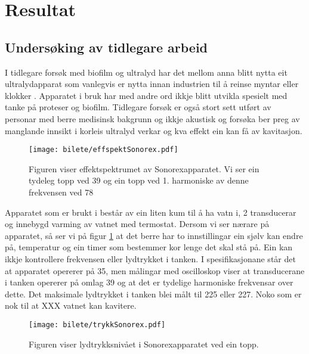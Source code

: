 \section{Resultat}
\subsection{Undersøking av tidlegare arbeid}
I tidlegare forsøk med biofilm og ultralyd har det mellom anna blitt nytta eit ultralydapparat som vanlegvis er nytta innan industrien til å reinse myntar eller klokker \cite{sonorex}. Apparatet i bruk har med andre ord ikkje blitt utvikla spesielt med tanke på proteser og biofilm. Tidlegare forsøk er også stort sett utført av personar med berre medisinsk bakgrunn og ikkje akustisk og forsøka ber preg av manglande innsikt i korleis ultralyd verkar og kva effekt ein kan få av kavitasjon.

\begin{figure}[htbp]
\centering
\texttt{[image: bilete/effspektSonorex.pdf]}
\caption[Effektspektrum av Sonorexapparat]{Figuren viser effektspektrumet av Sonorexapparatet. Vi ser ein tydeleg topp ved \unit{39}{\kilo\hertz} og ein topp ved 1. harmoniske av denne frekvensen ved \unit{78}{\kilo\hertz}}
\label{fig:effektsonorex}
\end{figure}

Apparatet som er brukt i \cite{ultraprotese} består av ein liten kum til å ha vatn i, 2 transducerar og innebygd varming av vatnet med termostat. Dersom vi ser nærare på apparatet, så ser vi på figur \ref{fig:effektsonorex} at det berre har to innstillingar ein sjølv kan endre på, temperatur og ein timer som bestemmer kor lenge det skal stå på. Ein kan ikkje kontrollere frekvensen eller lydtrykket i tanken. I spesifikasjonane \cite{sonorex} står det at apparatet opererer på \unit{35}{\kilo\hertz}, men målingar med oscilloskop viser at transducerane i tanken opererer på omlag \unit{39}{\kilo\hertz} og at det er tydelige harmoniske frekvensar over dette. Det maksimale lydtrykket i tanken blei målt til \unit{225}{\kilo\pascal} eller \unit{227}{\deci\bel}. Noko som er nok til at XXX vatnet kan kavitere. 

\begin{figure}[htbp]
\centering
\texttt{[image: bilete/trykkSonorex.pdf]}
\caption[Lydtrykksnivå i Sonorexapparat]{Figuren viser lydtrykksnivået i Sonorexapparatet ved ein topp.}
\label{fig:trykksonorex}
\end{figure}

